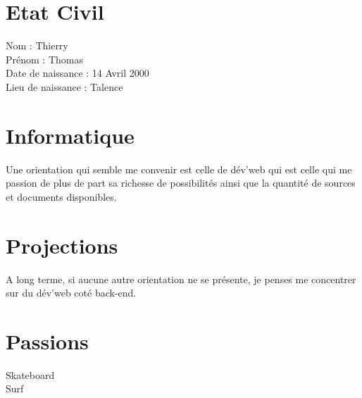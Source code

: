 \documentclass{article}
\begin{document}
\section{Etat Civil}
Nom : Thierry \\
Prénom : Thomas \\
Date de naissance : 14 Avril 2000 \\
Lieu de naissance : Talence \\

\section{Informatique}
Une orientation qui semble me convenir est celle de dév'web  qui est celle qui me passion de plus de part sa richesse de possibilités ainsi que la quantité de sources et documents disponibles.

\section{Projections} 
A long terme, si aucune autre orientation ne se présente, je penses me concentrer sur du dév'web coté back-end.

\section{Passions}
Skateboard \\
Surf \\ 
\end{document}
